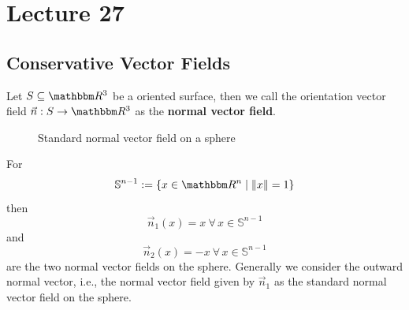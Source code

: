 \documentclass[../Analysis-3]{subfiles}
\begin{document}
\chapter*{Lecture 27} %
\setcounter{chapter}{27} %
\setcounter{section}{0}

\section{Conservative Vector Fields}

Let $S \subseteq \R^3$ be a oriented surface, then we call the orientation vector field $\vec{n} : S \to \R^3$ as the \textbf{normal vector field}.

\begin{Eg}{}{}
    \begin{figure}
        \centering
        \caption{Standard normal vector field on a sphere}\label{fig1:27}
    \end{figure}
    For
    \[
        \mathbb{S}^{n-1} := \{ x \in \R^n \mid \| x \| = 1 \}
    \]
    then
    \[
        \vec{n}_1(x) = x \ \forall \, x \in \mathbb{S}^{n-1}
    \]
    and
    \[
        \vec{n}_2(x) = -x \ \forall \, x \in \mathbb{S}^{n-1}
    \]
    are the two normal vector fields on the sphere. Generally we consider the outward normal vector, i.e., the normal vector field given by $\vec{n}_1$ as the standard normal vector field on the sphere.
\end{Eg}
\end{document}
